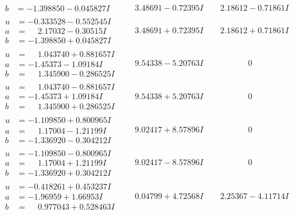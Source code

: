 \documentclass[1p]{elsarticle_modified}
\theoremstyle{definition}
\begin{document}
$$\begin{array}{c|c|c}
\begin{aligned}
b &= -1.398850 - 0.045827 I\end{aligned}
 & \phantom{-}3.48691 - 0.72395 I & \phantom{-}2.18612 - 0.71861 I \\ \hline\begin{aligned}
u &= -0.333528 - 0.552545 I \\
a &= \phantom{-}2.17032 - 0.30515 I \\
b &= -1.398850 + 0.045827 I\end{aligned}
 & \phantom{-}3.48691 + 0.72395 I & \phantom{-}2.18612 + 0.71861 I \\ \hline\begin{aligned}
u &= \phantom{-}1.043740 + 0.881657 I \\
a &= -1.45373 - 1.09184 I \\
b &= \phantom{-}1.345900 - 0.286525 I\end{aligned}
 & \phantom{-}9.54338 - 5.20763 I & \phantom{-0.000000 } 0 \\ \hline\begin{aligned}
u &= \phantom{-}1.043740 - 0.881657 I \\
a &= -1.45373 + 1.09184 I \\
b &= \phantom{-}1.345900 + 0.286525 I\end{aligned}
 & \phantom{-}9.54338 + 5.20763 I & \phantom{-0.000000 } 0 \\ \hline\begin{aligned}
u &= -1.109850 + 0.800965 I \\
a &= \phantom{-}1.17004 - 1.21199 I \\
b &= -1.336920 - 0.304212 I\end{aligned}
 & \phantom{-}9.02417 + 8.57896 I & \phantom{-0.000000 } 0 \\ \hline\begin{aligned}
u &= -1.109850 - 0.800965 I \\
a &= \phantom{-}1.17004 + 1.21199 I \\
b &= -1.336920 + 0.304212 I\end{aligned}
 & \phantom{-}9.02417 - 8.57896 I & \phantom{-0.000000 } 0 \\ \hline\begin{aligned}
u &= -0.418261 + 0.453237 I \\
a &= -1.96959 + 1.66953 I \\
b &= \phantom{-}0.977043 + 0.528463 I\end{aligned}
 & \phantom{-}0.04799 + 4.72568 I & \phantom{-}2.25367 - 4.11714 I \\ \hline\begin{aligned}

\end{aligned}
\end{array}$$
\end{document}
